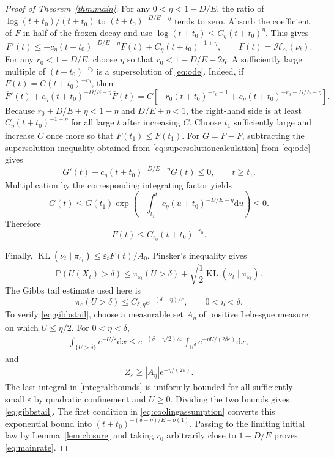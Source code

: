 \documentclass[10pt,a4paper]{amsart}
\newcommand{\KL}{\operatorname{KL}}
\newcommand{\R}{\mathbb R}
\newcommand{\cH}{\mathcal H}
\newcommand{\dd}{\mathrm d}
\newcommand{\eps}{\varepsilon}
\theoremstyle{plain}
\theoremstyle{definition}
\begin{document}
\begin{proof}[Proof of Theorem~\ref{thm:main}]
For any $0<\eta<1-D/E$, the ratio of
$\log(t+t_0)/(t+t_0)$ to $(t+t_0)^{-D/E-\eta}$ tends to zero.
Absorb the coefficient of $F$ in half of the frozen decay and use
$\log(t+t_0)\leq C_\eta(t+t_0)^\eta$. This gives
\begin{equation}\label{eq:ode}
 F'(t)\leq-c_\eta(t+t_0)^{-D/E-\eta}F(t)
              +C_\eta(t+t_0)^{-1+\eta},
 \qquad F(t)=\cH_{\eps_t}(\nu_t).
\end{equation}
For any $r_0<1-D/E$, choose $\eta$ so that
$r_0<1-D/E-2\eta$. A sufficiently large multiple of
$(t+t_0)^{-r_0}$ is a supersolution of \eqref{eq:ode}. Indeed, if
$\overline F(t)=C(t+t_0)^{-r_0}$, then
\begin{equation}\label{eq:supersolutioncalculation}
 \overline F'(t)+c_\eta(t+t_0)^{-D/E-\eta}\overline F(t)
 ={C}\left[-r_0(t+t_0)^{-r_0-1}
 +c_\eta(t+t_0)^{-r_0-D/E-\eta}\right].
\end{equation}
Because $r_0+D/E+\eta<1-\eta$ and $D/E+\eta<1$, the right-hand side is at
least $C_\eta(t+t_0)^{-1+\eta}$ for all large $t$ after increasing $C$.
Choose $t_1$ sufficiently large and increase $C$ once more so that
$F(t_1)\leq\overline F(t_1)$. For $G=F-\overline F$, subtracting the
supersolution inequality obtained from
\eqref{eq:supersolutioncalculation} from \eqref{eq:ode}
gives
\[
 G'(t)+c_\eta(t+t_0)^{-D/E-\eta}G(t)\leq0,
 \qquad t\geq t_1.
\]
Multiplication by the corresponding integrating factor yields
\[
 G(t)\leq G(t_1)
 \exp\left(-\int_{t_1}^tc_\eta(u+t_0)^{-D/E-\eta}\dd u\right)\leq0.
\]
Therefore
\[
F(t)\leq C_{r_0}(t+t_0)^{-r_0}.
\]

Finally, $\KL(\nu_t\mid\pi_{\eps_t})\leq\eps_tF(t)/A_0$.
Pinsker's inequality gives
\[
 \mathbb P(U(X_t)>\delta)
 \leq\pi_{\eps_t}(U>\delta)
                   +\sqrt{\frac12\KL(\nu_t\mid\pi_{\eps_t})}.
\]
The Gibbs tail estimate used here is
\begin{equation}\label{eq:gibbstail}
 \pi_\eps(U>\delta)\leq C_{\delta,\eta}e^{-(\delta-\eta)/\eps},
 \qquad 0<\eta<\delta.
\end{equation}
To verify \eqref{eq:gibbstail}, choose a measurable set $A_\eta$ of positive
Lebesgue measure on which $U\leq\eta/2$. For $0<\eta<\delta$,
\begin{align}\label{integral:bounds}
 \int_{\{U>\delta\}}e^{-U/\eps}\dd x
 \leq e^{-(\delta-\eta/2)/\eps}
       \int_{\R^d}e^{-\eta U/(2\delta\eps)}\dd x,
\end{align}
and
\begin{align*}
 Z_\eps\geq |A_\eta|e^{-\eta/(2\eps)}.
\end{align*}
The last integral in \eqref{integral:bounds} is uniformly bounded for all sufficiently
small $\eps$ by quadratic confinement and $U\geq0$. Dividing the two bounds
gives \eqref{eq:gibbstail}.
The first condition in \eqref{eq:coolingassumption} converts this exponential
bound into $(t+t_0)^{-(\delta-\eta)/E+o(1)}$. Passing to the limiting initial
law by Lemma~\ref{lem:closure} and taking $r_0$ arbitrarily close to $1-D/E$
proves \eqref{eq:mainrate}.
\end{proof}
\end{document}
